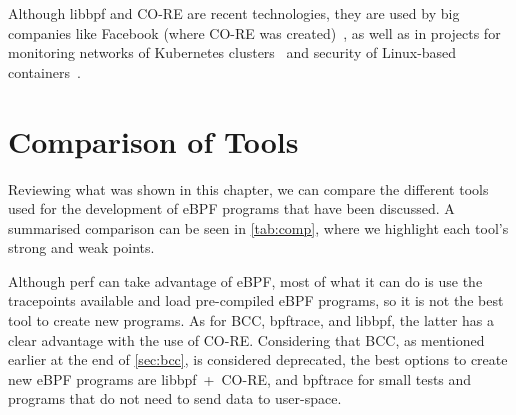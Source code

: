 Although libbpf and \ac{CO-RE} are recent technologies, they are used by big
companies like Facebook (where \ac{CO-RE} was created)~\cite{fbslide}, as well
as in projects for monitoring networks of Kubernetes clusters~\cite{kuber} and
security of Linux-based containers~\cite{sec}.


\section{Comparison of Tools}

Reviewing what was shown in this chapter, we can compare the different tools
used for the development of eBPF programs that have been discussed. A summarised
comparison can be seen in \autoref{tab:comp}, where we highlight each tool's
strong and weak points.

Although perf can take advantage of eBPF, most of what it can do is
use the tracepoints available and load pre-compiled eBPF programs, so it is not
the best tool to create new programs. As for \ac{BCC}, bpftrace, and libbpf,
the latter has a clear advantage with the use of \ac{CO-RE}. Considering that
\ac{BCC}, as mentioned earlier at the end of \autoref{sec:bcc}, is considered
deprecated, the best options to create new eBPF programs are \mbox{libbpf +
\ac{CO-RE}}, and bpftrace for small tests and programs that do not need to send
data to user-space.

